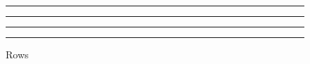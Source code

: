 \documentclass{article}
\begin{document}
\begin{figure}
\begin{minipage}{0.08\textwidth}\end{minipage}
\begin{minipage}{0.44\textwidth}\rule{\linewidth}{2cm}\end{minipage}
\begin{minipage}{0.44\textwidth}\rule{\linewidth}{2cm}\end{minipage}

\begin{minipage}{0.08\textwidth}\end{minipage}
\begin{minipage}{0.44\textwidth}\rule{\linewidth}{2cm}\end{minipage}
\begin{minipage}{0.44\textwidth}\rule{\linewidth}{2cm}\end{minipage}
\caption{Rows}
\end{figure}
\end{document}
